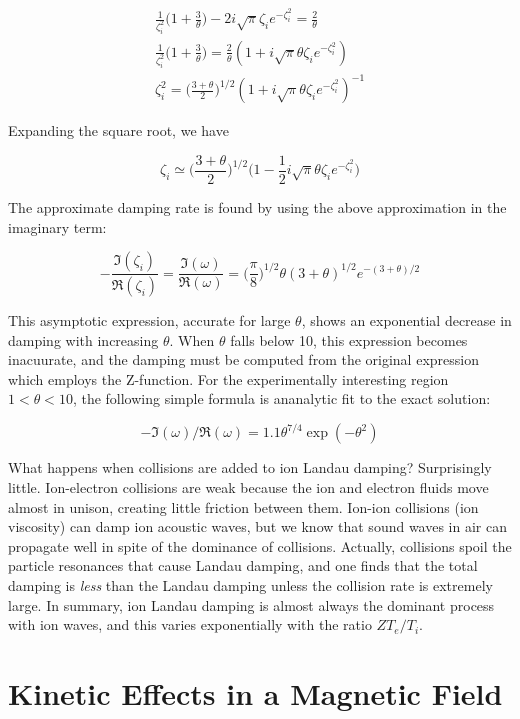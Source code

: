 \documentclass[
  notoc %
]{tufte-book}
\begin{document}
\[
\begin{aligned}
\frac{1}{\zeta_i^2}\Big( 1+\frac{3}{\theta} \Big) - 2i\sqrt{\pi}\zeta_i e^{-\zeta_i^2} = \frac{2}{\theta} \\
\frac{1}{\zeta_i^2}\Big( 1+\frac{3}{\theta} \Big) = \frac{2}{\theta}(1+i\sqrt{\pi}\theta\zeta_i e^{-\zeta_i^2}) \\
\zeta_i^2 = \Big(\frac{3+\theta}{2}\Big)^{1/2}(1+i\sqrt{\pi}\theta\zeta_i e^{-\zeta_i^2})^{-1}
\end{aligned}
\]

Expanding the square root, we have

\[
\zeta_i \simeq \Big(\frac{3+\theta}{2}\Big)^{1/2}\Big(1-\frac{1}{2}i\sqrt{\pi}\theta\zeta_i e^{-\zeta_i^2}\Big)
\]

The approximate damping rate is found by using the above approximation
in the imaginary term:

\[
-\frac{\Im(\zeta_i)}{\Re(\zeta_i)} = \frac{\Im(\omega)}{\Re(\omega)} = \Big(\frac{\pi}{8} \Big)^{1/2}\theta (3+\theta)^{1/2} e^{-(3+\theta)/2}
\]

This asymptotic expression, accurate for large \(\theta\), shows an
exponential decrease in damping with increasing \(\theta\). When
\(\theta\) falls below 10, this expression becomes inacuurate, and the
damping must be computed from the original expression which employs the
Z-function. For the experimentally interesting region \(1<\theta<10\),
the following simple formula is ananalytic fit to the exact solution:

\[
-\Im(\omega)/\Re(\omega) = 1.1\theta^{7/4}\exp(-\theta^2)
\]

What happens when collisions are added to ion Landau damping?
Surprisingly little. Ion-electron collisions are weak because the ion
and electron fluids move almost in unison, creating little friction
between them. Ion-ion collisions (ion viscosity) can damp ion acoustic
waves, but we know that sound waves in air can propagate well in spite
of the dominance of collisions. Actually, collisions spoil the particle
resonances that cause Landau damping, and one finds that the total
damping is \emph{less} than the Landau damping unless the collision rate
is extremely large. In summary, ion Landau damping is almost always the
dominant process with ion waves, and this varies exponentially with the
ratio \(ZT_e/T_i\).

\hypertarget{kinetic-effects-in-a-magnetic-field}{%
\section{Kinetic Effects in a Magnetic
Field}\label{kinetic-effects-in-a-magnetic-field}}
\end{document}
